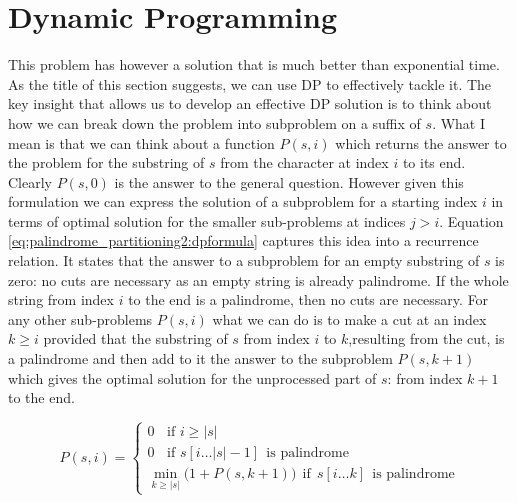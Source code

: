 


\section{Dynamic Programming}
\label{sec:palindrome_partitioning2:DP}
This problem has however a solution that is much better than exponential time. As the title of this
section suggests, we can use DP to effectively tackle it. The key insight that allows us to develop
an effective DP solution is to think about how we can break down the problem into subproblem on a
suffix of $s$. What I mean is that we can think about a function $P(s, i)$ which returns the answer
to the problem for the substring of $s$ from the character at index $i$ to its end. Clearly $P(s,0)$
is the answer to the general question. However given this formulation  we can express the solution
of a subproblem for a starting index $i$ in terms of optimal solution for the smaller sub-problems
at indices $j>i$. Equation \ref{eq:palindrome_partitioning2:dpformula} captures this idea into a
recurrence relation. It states that the answer to a subproblem for an empty substring of $s$ is
zero: no cuts are necessary as an empty string is already palindrome. If the whole string from index
$i$ to the end is a palindrome, then no cuts are necessary. For any other sub-problems $P(s,i)$ what
we can do is to make a cut at an index $k\geq i$ provided that  the  substring of $s$ from index $i$
to $k$,resulting from the cut, is a palindrome and then add to it the answer to the subproblem
$P(s,k+1)$ which gives the optimal solution for the unprocessed part of $s$: from index $k+1$ to the
end.

\begin{equation}
	P(s, i) = \begin{cases}
		0 \; \; \text{ if } i \geq |s|  \\
		0 \; \; \text{ if } s[i\ldots |s|-1]  \:\: \text{is palindrome}  \\
		\min_{k\geq |s|} \big( 1 + P(s,k+1) \big) \: \: \text{if} \: \: s[i\ldots k]  \:\: \text{is palindrome}
	 \end{cases}
	\label{eq:palindrome_partitioning2:dpformula}
\end{equation}

